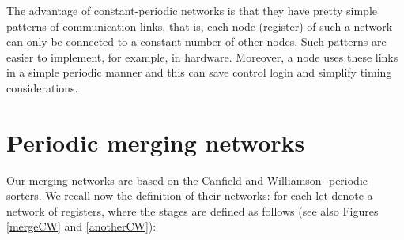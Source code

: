 \documentclass{llncs}
\begin{document}
The advantage of constant-periodic networks is that they have pretty
simple patterns of communication links, that is, each node (register)
of such a network can only be connected to a constant number of other
nodes. Such patterns are easier to implement, for example, in hardware.
Moreover, a node uses these links in a simple periodic manner and this
can save control login and simplify timing considerations.

\section{Periodic merging networks}

Our merging networks are based on the Canfield and Williamson \cite{cw}
-periodic sorters. We recall now the definition of their
networks: for each  let  denote a network of
 registers, where the stages are defined as follows (see also
Figures \ref{mergeCW} and \ref{anotherCW}):
\end{document}
